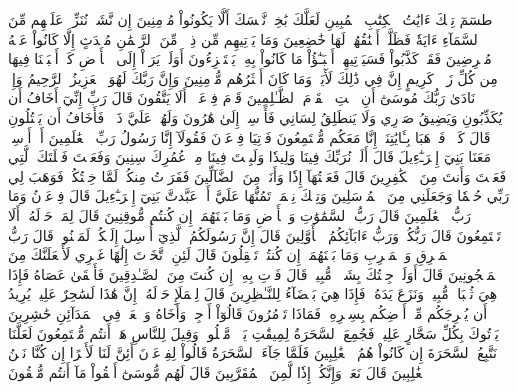 طسٓمٓ
تِلۡكَ ءَايَٰتُ ٱلۡكِتَٰبِ ٱلۡمُبِينِ
لَعَلَّكَ بَٰخِعٞ نَّفۡسَكَ أَلَّا يَكُونُواْ مُؤۡمِنِينَ
إِن نَّشَأۡ نُنَزِّلۡ عَلَيۡهِم مِّنَ ٱلسَّمَآءِ ءَايَةٗ فَظَلَّتۡ أَعۡنَٰقُهُمۡ لَهَا خَٰضِعِينَ
وَمَا يَأۡتِيهِم مِّن ذِكۡرٖ مِّنَ ٱلرَّحۡمَٰنِ مُحۡدَثٍ إِلَّا كَانُواْ عَنۡهُ مُعۡرِضِينَ
فَقَدۡ كَذَّبُواْ فَسَيَأۡتِيهِمۡ أَنۢبَـٰٓؤُاْ مَا كَانُواْ بِهِۦ يَسۡتَهۡزِءُونَ
أَوَلَمۡ يَرَوۡاْ إِلَى ٱلۡأَرۡضِ كَمۡ أَنۢبَتۡنَا فِيهَا مِن كُلِّ زَوۡجٖ كَرِيمٍ
إِنَّ فِي ذَٰلِكَ لَأٓيَةٗۖ وَمَا كَانَ أَكۡثَرُهُم مُّؤۡمِنِينَ
وَإِنَّ رَبَّكَ لَهُوَ ٱلۡعَزِيزُ ٱلرَّحِيمُ
وَإِذۡ نَادَىٰ رَبُّكَ مُوسَىٰٓ أَنِ ٱئۡتِ ٱلۡقَوۡمَ ٱلظَّـٰلِمِينَ
قَوۡمَ فِرۡعَوۡنَۚ أَلَا يَتَّقُونَ
قَالَ رَبِّ إِنِّيٓ أَخَافُ أَن يُكَذِّبُونِ
وَيَضِيقُ صَدۡرِي وَلَا يَنطَلِقُ لِسَانِي فَأَرۡسِلۡ إِلَىٰ هَٰرُونَ
وَلَهُمۡ عَلَيَّ ذَنۢبٞ فَأَخَافُ أَن يَقۡتُلُونِ
قَالَ كَلَّاۖ فَٱذۡهَبَا بِـَٔايَٰتِنَآۖ إِنَّا مَعَكُم مُّسۡتَمِعُونَ
فَأۡتِيَا فِرۡعَوۡنَ فَقُولَآ إِنَّا رَسُولُ رَبِّ ٱلۡعَٰلَمِينَ
أَنۡ أَرۡسِلۡ مَعَنَا بَنِيٓ إِسۡرَـٰٓءِيلَ
قَالَ أَلَمۡ نُرَبِّكَ فِينَا وَلِيدٗا وَلَبِثۡتَ فِينَا مِنۡ عُمُرِكَ سِنِينَ
وَفَعَلۡتَ فَعۡلَتَكَ ٱلَّتِي فَعَلۡتَ وَأَنتَ مِنَ ٱلۡكَٰفِرِينَ
قَالَ فَعَلۡتُهَآ إِذٗا وَأَنَا۠ مِنَ ٱلضَّآلِّينَ
فَفَرَرۡتُ مِنكُمۡ لَمَّا خِفۡتُكُمۡ فَوَهَبَ لِي رَبِّي حُكۡمٗا وَجَعَلَنِي مِنَ ٱلۡمُرۡسَلِينَ
وَتِلۡكَ نِعۡمَةٞ تَمُنُّهَا عَلَيَّ أَنۡ عَبَّدتَّ بَنِيٓ إِسۡرَـٰٓءِيلَ
قَالَ فِرۡعَوۡنُ وَمَا رَبُّ ٱلۡعَٰلَمِينَ
قَالَ رَبُّ ٱلسَّمَٰوَٰتِ وَٱلۡأَرۡضِ وَمَا بَيۡنَهُمَآۖ إِن كُنتُم مُّوقِنِينَ
قَالَ لِمَنۡ حَوۡلَهُۥٓ أَلَا تَسۡتَمِعُونَ
قَالَ رَبُّكُمۡ وَرَبُّ ءَابَآئِكُمُ ٱلۡأَوَّلِينَ
قَالَ إِنَّ رَسُولَكُمُ ٱلَّذِيٓ أُرۡسِلَ إِلَيۡكُمۡ لَمَجۡنُونٞ
قَالَ رَبُّ ٱلۡمَشۡرِقِ وَٱلۡمَغۡرِبِ وَمَا بَيۡنَهُمَآۖ إِن كُنتُمۡ تَعۡقِلُونَ
قَالَ لَئِنِ ٱتَّخَذۡتَ إِلَٰهًا غَيۡرِي لَأَجۡعَلَنَّكَ مِنَ ٱلۡمَسۡجُونِينَ
قَالَ أَوَلَوۡ جِئۡتُكَ بِشَيۡءٖ مُّبِينٖ
قَالَ فَأۡتِ بِهِۦٓ إِن كُنتَ مِنَ ٱلصَّـٰدِقِينَ
فَأَلۡقَىٰ عَصَاهُ فَإِذَا هِيَ ثُعۡبَانٞ مُّبِينٞ
وَنَزَعَ يَدَهُۥ فَإِذَا هِيَ بَيۡضَآءُ لِلنَّـٰظِرِينَ
قَالَ لِلۡمَلَإِ حَوۡلَهُۥٓ إِنَّ هَٰذَا لَسَٰحِرٌ عَلِيمٞ
يُرِيدُ أَن يُخۡرِجَكُم مِّنۡ أَرۡضِكُم بِسِحۡرِهِۦ فَمَاذَا تَأۡمُرُونَ
قَالُوٓاْ أَرۡجِهۡ وَأَخَاهُ وَٱبۡعَثۡ فِي ٱلۡمَدَآئِنِ حَٰشِرِينَ
يَأۡتُوكَ بِكُلِّ سَحَّارٍ عَلِيمٖ
فَجُمِعَ ٱلسَّحَرَةُ لِمِيقَٰتِ يَوۡمٖ مَّعۡلُومٖ
وَقِيلَ لِلنَّاسِ هَلۡ أَنتُم مُّجۡتَمِعُونَ
لَعَلَّنَا نَتَّبِعُ ٱلسَّحَرَةَ إِن كَانُواْ هُمُ ٱلۡغَٰلِبِينَ
فَلَمَّا جَآءَ ٱلسَّحَرَةُ قَالُواْ لِفِرۡعَوۡنَ أَئِنَّ لَنَا لَأَجۡرًا إِن كُنَّا نَحۡنُ ٱلۡغَٰلِبِينَ
قَالَ نَعَمۡ وَإِنَّكُمۡ إِذٗا لَّمِنَ ٱلۡمُقَرَّبِينَ
قَالَ لَهُم مُّوسَىٰٓ أَلۡقُواْ مَآ أَنتُم مُّلۡقُونَ
